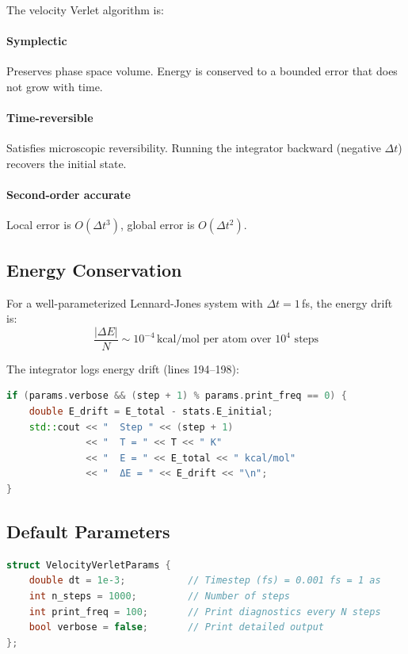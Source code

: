 \documentclass[11pt]{article}
\begin{document}
The velocity Verlet algorithm is:

\paragraph{Symplectic} Preserves phase space volume. Energy is conserved to a bounded error that does not grow with time.

\paragraph{Time-reversible} Satisfies microscopic reversibility. Running the integrator backward (negative $\Delta t$) recovers the initial state.

\paragraph{Second-order accurate} Local error is $O(\Delta t^3)$, global error is $O(\Delta t^2)$.

\subsection{Energy Conservation}

For a well-parameterized Lennard-Jones system with $\Delta t = 1$\,fs, the energy drift is:
\begin{equation}
\frac{|\Delta E|}{N} \sim 10^{-4}\,\text{kcal/mol per atom over } 10^4\text{ steps}
\end{equation}

The integrator logs energy drift (lines 194--198):

\begin{lstlisting}[language=C++]
if (params.verbose && (step + 1) % params.print_freq == 0) {
    double E_drift = E_total - stats.E_initial;
    std::cout << "  Step " << (step + 1) 
              << "  T = " << T << " K"
              << "  E = " << E_total << " kcal/mol"
              << "  ΔE = " << E_drift << "\n";
}
\end{lstlisting}

\subsection{Default Parameters}

\begin{lstlisting}[language=C++]
struct VelocityVerletParams {
    double dt = 1e-3;           // Timestep (fs) = 0.001 fs = 1 as
    int n_steps = 1000;         // Number of steps
    int print_freq = 100;       // Print diagnostics every N steps
    bool verbose = false;       // Print detailed output
};
\end{lstlisting}
\end{document}
